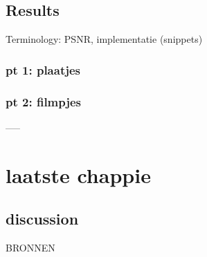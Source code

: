 \documentclass[11pt]{amsbook}
\theoremstyle{definition}
\begin{document}
\section{Results}
Terminology: PSNR, implementatie (snippets)

\subsection{pt 1: plaatjes}
\subsection{pt 2: filmpjes}

-----

\chapter{laatste chappie}
\section{discussion}

BRONNEN
\end{document}
